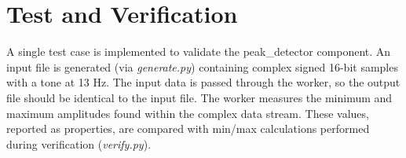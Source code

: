 \documentclass{article}
\def\comp{peak\_detector}
\begin{document}
\section*{Test and Verification}
\normalsize

\begin{flushleft}

A single test case is implemented to validate the {\comp} component. An input file is generated (via \textit{generate.py}) containing complex signed 16-bit samples with a tone at 13 Hz. The input data is passed through the worker, so the output file should be identical to the input file. The worker measures the minimum and maximum amplitudes found within the complex data stream. These values, reported as properties, are compared with min/max calculations performed during verification (\textit{verify.py}).



\end{flushleft}
\end{document}
